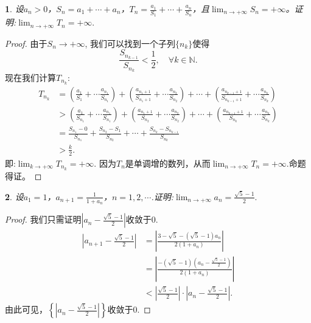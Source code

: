 \documentclass[utf8]{book}
\newtheorem{example}{}[section]             %
\begin{document}
\begin{example}
设$a_n > 0$，$S_n=a_1+\cdots+a_n$，$T_n=\displaystyle\frac{a_1}{S_1}+\cdots+\frac{a_n}{S_n}$，且$\displaystyle  \lim_{n\to +\infty}S_n=+\infty$。证明:$\displaystyle  \lim_{n\to +\infty}T_n=+\infty.$
\end{example}
\begin{proof}
由于$S_n \rightarrow  +\infty$, 我们可以找到一个子列$\{n_k\}$使得
$$\frac{S_{n_{k-1}}}{S_{n_k}} < \frac{1}{2}, \quad\forall k\in\mathbb{N}.$$
现在我们计算$T_{n_k}$:
\begin{equation*}
\begin{split}
T_{n_k} &= \left(\frac{a_1}{S_1}+\cdots \frac{a_{n_1}}{S_{n_1}}\right) + \left(\frac{a_{n_1+1}}{S_{n_1+1}}+\cdots \frac{a_{n_2}}{S_{n_2}}\right) +\cdots+\left(\frac{a_{n_{k-1}+1}}{S_{n_{k-1}+1}}+\cdots \frac{a_{n_k}}{S_{n_k}}\right) \\
&> \left(\frac{a_1}{S_{n_1}}+\cdots \frac{a_{n_1}}{S_{n_1}}\right) + \left(\frac{a_{n_1+1}}{S_{n_2}}+\cdots \frac{a_{n_2}}{S_{n_2}}\right) +\cdots+\left(\frac{a_{n_{k-1}+1}}{S_{n_k}}+\cdots \frac{a_{n_k}}{S_{n_k}}\right)\\
&=\frac{S_{n_1}- 0}{S_{n_1}} + \frac{S_{n_2}-S_1}{S_{n_2}} + \cdots +  \frac{S_{n_k}-S_{n_{k-1}}}{S_{n_{k}}}\\
&>\frac{k}{2}.
\end{split}
\end{equation*}
即:$\displaystyle \lim_{k\to +\infty}T_{n_k}=+\infty.$
因为$T_n$是单调增的数列，从而$\displaystyle \lim_{n\to +\infty}T_{n}=+\infty.$命题 得证。
\end{proof}
\begin{example}
设$a_1=1$，$a_{n+1}=\displaystyle\frac{1}{1+a_n}$，$n=1,2,\cdots$.证明:$\displaystyle  \lim_{n\to +\infty}a_n=\frac{\sqrt{5}-1}{2}.$
\end{example}
\begin{proof}我们只需证明$\left|a_n -\frac{\sqrt{5}-1}{2}\right|$收敛于$0$.
\begin{equation*}
\begin{split}
\left|a_{n+1} - \frac{\sqrt{5}-1}{2}\right| &= \left|\frac{3-\sqrt{5} - (\sqrt{5}-1)a_n}{2(1+a_n)}\right|\\
&=\left|\frac{-(\sqrt{5}-1)\left(a_n-\displaystyle\frac{\sqrt{5}-1}{2}\right)}{2(1+a_n)}\right|\\
&<\left|\frac{\sqrt{5}-1}{2}\right|\cdot\left|a_n-\frac{\sqrt{5}-1}{2}\right|.
\end{split}
\end{equation*}
由此可见，$\left\{\left|a_n-\frac{\sqrt{5}-1}{2}\right|\right\}$收敛于$0$.
\end{proof}
\end{document}
